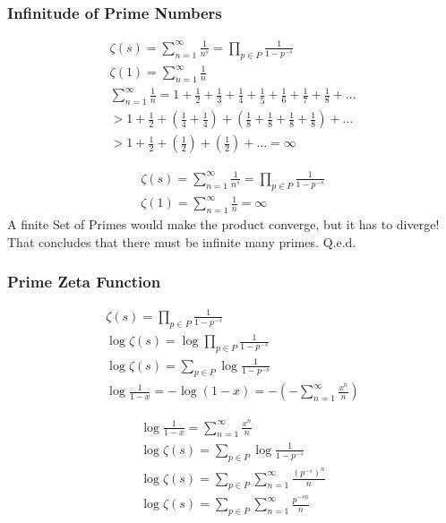 	\subsubsection{Infinitude of Prime Numbers} 
	
	$$
	\begin{gathered}
		\zeta(s)=\sum_{n=1}^{\infty} \frac{1}{n^s}=\prod_{p \in P} \frac{1}{1-p^{-s}} \\
		\zeta(1)=\sum_{n=1}^{\infty} \frac{1}{n} \\
		\sum_{n=1}^{\infty} \frac{1}{n}=1+\frac{1}{2}+\frac{1}{3}+\frac{1}{4}+\frac{1}{5}+\frac{1}{6}+\frac{1}{7}+\frac{1}{8}+\ldots \\
		>1+\frac{1}{2}+\left(\frac{1}{4}+\frac{1}{4}\right)+\left(\frac{1}{8}+\frac{1}{8}+\frac{1}{8}+\frac{1}{8}\right)+\ldots \\
		>1+\frac{1}{2}+\left(\frac{1}{2}\right)+\left(\frac{1}{2}\right)+\ldots=\infty
	\end{gathered}
	$$
	
	$$
	\begin{gathered}
		\zeta(s)=\sum_{n=1}^{\infty} \frac{1}{n^s}=\prod_{p \in P} \frac{1}{1-p^{-s}} \\
		\zeta(1)=\sum_{n=1}^{\infty} \frac{1}{n}=\infty
	\end{gathered}
	$$
	A finite Set of Primes would make the product converge, but it has to diverge! That concludes that there must be infinite many primes.
	Q.e.d.
	
	\subsubsection{Prime Zeta Function} 
	
	$$
	\begin{gathered}
		\zeta(s)=\prod_{p \in P} \frac{1}{1-p^{-s}} \\
		\log \zeta(s)=\log \prod_{p \in P} \frac{1}{1-p^{-s}} \\
		\log \zeta(s)=\sum_{p \in P} \log \frac{1}{1-p^{-s}} \\
		\log \frac{1}{1-x}=-\log (1-x)=-\left(-\sum_{n=1}^{\infty} \frac{x^n}{n}\right)
	\end{gathered}
	$$
	
	$$
	\begin{gathered}
		\log \frac{1}{1-x}=\sum_{n=1}^{\infty} \frac{x^n}{n} \\
		\log \zeta(s)=\sum_{p \in P} \log \frac{1}{1-p^{-s}} \\
		\log \zeta(s)=\sum_{p \in P} \sum_{n=1}^{\infty} \frac{\left(p^{-s}\right)^n}{n} \\
		\log \zeta(s)=\sum_{p \in P} \sum_{n=1}^{\infty} \frac{p^{-s n}}{n}
	\end{gathered}
	$$
	
